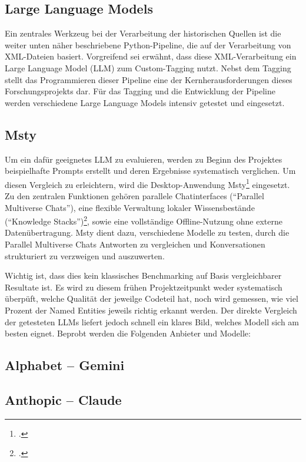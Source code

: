 \documentclass[12pt, a4paper, ngerman, bidi=default]{article}
\let\cite\footcite
\begin{document}
\subsection{Large Language Models} \label{subsubsec:LLM_use}
Ein zentrales Werkzeug bei der Verarbeitung der historischen Quellen ist die weiter unten näher beschriebene Python-Pipeline, die auf der Verarbeitung von XML-Dateien basiert. Vorgreifend sei erwähnt, dass diese XML-Verarbeitung ein Large Language Model (LLM) zum Custom-Tagging nutzt. Nebst dem Tagging stellt das Programmieren dieser Pipeline eine der Kernherausforderungen dieses Forschungsprojekts dar. 
Für das Tagging und die Entwicklung der Pipeline werden verschiedene Large Language Models intensiv getestet und eingesetzt.
\subsection{Msty}
Um ein dafür geeignetes LLM zu evaluieren, werden zu Beginn des Projektes beispielhafte Prompts erstellt und deren Ergebnisse systematisch verglichen. Um diesen Vergleich zu erleichtern, wird die Desktop-Anwendung Msty\cite[vgl][]{noauthor_msty_nodate} eingesetzt. Zu den zentralen Funktionen gehören parallele Chatinterfaces (\enquote{Parallel Multiverse Chats}),
eine flexible Verwaltung lokaler Wissensbestände (\enquote{Knowledge Stacks})\cite[vgl][]{noauthor_msty_nodate}, sowie eine vollständige Offline-Nutzung ohne externe Datenübertragung. Msty dient dazu, verschiedene Modelle zu testen, durch die Parallel Multiverse Chats Antworten zu vergleichen und Konversationen strukturiert zu verzweigen und auszuwerten.

Wichtig ist, dass dies kein klassisches Benchmarking auf Basis vergleichbarer Resultate ist. Es wird zu diesem frühen Projektzeitpunkt weder systematisch überpüft, welche Qualität der jeweilge Codeteil hat, noch wird gemessen, wie viel Prozent der Named Entities jeweils richtig erkannt werden. Der direkte Vergleich der getesteten LLMs liefert jedoch schnell ein klares Bild, welches Modell sich am besten eignet. Beprobt werden die Folgenden Anbieter und Modelle:



\subsection{Alphabet – Gemini}
\subsection{Anthopic – Claude}
\end{document}
